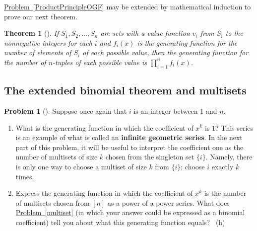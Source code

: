\documentclass[10pt,]{book}
\newcommand{\terminology}[1]{\textbf{#1}}
\theoremstyle{plain}
\newtheorem{theorem}{Theorem}[section]
\theoremstyle{definition}
\newtheorem{activity}[project]{Problem}
\theoremstyle{definition}
\numberwithin{equation}{chapter}
\begin{document}
\hypertarget{p-1095}{}%
\hyperref[ProductPrincipleOGF]{Problem~\ref{ProductPrincipleOGF}} may be extended by mathematical induction to prove our next theorem.%
\begin{theorem}[{}]\label{theorem-7}
\hypertarget{p-1096}{}%
If \(S_1,S_2,\dots,S_n\) are sets with a value function \(v_i\) from \(S_i\) to the nonnegative integers for each \(i\) and \(f_i(x)\) is the generating function for the number of elements of \(S_i\) of each possible value, then the generating function for the number of \(n\)-tuples of each possible value is \(\prod_{i=1}^n f_i(x)\).%
\end{theorem}
\typeout{************************************************}
\typeout{************************************************}
\subsection[{The extended binomial theorem and multisets}]{The extended binomial theorem and multisets}\label{subsection-45}
\begin{activity}[] \label{activity-192}
\hypertarget{p-1097}{}%
Suppose once again that \(i\) is an integer between 1 and \(n\).%
\begin{enumerate}[font=\bfseries,label=(\alph*),ref=\alph*]
\item\label{task-131} \marginsymbol[-2.5em]{} \hypertarget{p-1098}{}%
What is the generating function in which the coefficient of \(x^k\) is \(1\)? This series is an example of what is called an \terminology{infinite geometric series}. In the next part of this problem, it will be useful to interpret the coefficient one as the number of multisets of size \(k\) chosen from the singleton set \(\{i\}\). Namely, there is only one way to choose a multiset of size \(k\) from \(\{i\}\): choose \(i\) exactly \(k\) times.%
\item\label{task-132} \marginsymbol[-2.5em]{} \hypertarget{p-1100}{}%
Express the generating function in which the coefficient of \(x^k\) is the number of multisets chosen from \([n]\) as a power of a power series.  What does \hyperref[multiset]{Problem~\ref{multiset}} (in which your answer could be expressed as a binomial coefficient) tell you about what this generating function equals?%
~{\tiny (h)}\end{enumerate}
\end{activity}
\end{document}
